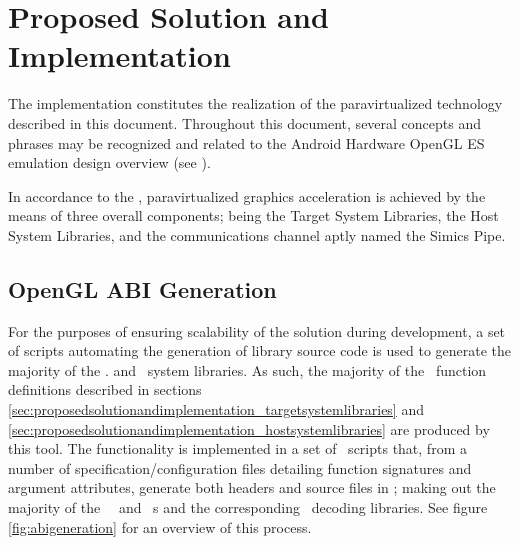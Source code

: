 
\chapter{Proposed Solution and Implementation}
\label{cha:proposedsolutionandimplementation}
The implementation constitutes the realization of the paravirtualized technology described in this document.
Throughout this document, several concepts and phrases may be recognized and related to the Android Hardware OpenGL ES emulation design overview (see ).

In accordance to the \dvttermreferencesolution , paravirtualized graphics acceleration is achieved by the means of three overall components; being the Target System Libraries, the Host System Libraries, and the communications channel aptly named the Simics Pipe.



\section{OpenGL ABI Generation}
\label{sec:proposedsolutionandimplementation_openglabigeneration}
For the purposes of ensuring scalability of the solution during development, a set of scripts automating the generation of library source code is used to generate the majority of the \dvttermtarget . and \dvttermhost\ system libraries.
As such, the majority of the \dvttermopengl\ function definitions described in sections \ref{sec:proposedsolutionandimplementation_targetsystemlibraries} and \ref{sec:proposedsolutionandimplementation_hostsystemlibraries} are produced by this tool.
The functionality is implemented in a set of \dvttermpython\ scripts that, from a number of specification/configuration files detailing function signatures and argument attributes, generate both headers and source files in \dvttermc ; making out the majority of the \dvttermtarget\ \dvttermopengl\ and \dvttermegl\ \dvttermabi s and the corresponding \dvttermhost\ decoding libraries.
See figure \ref{fig:abigeneration} for an overview of this process.




